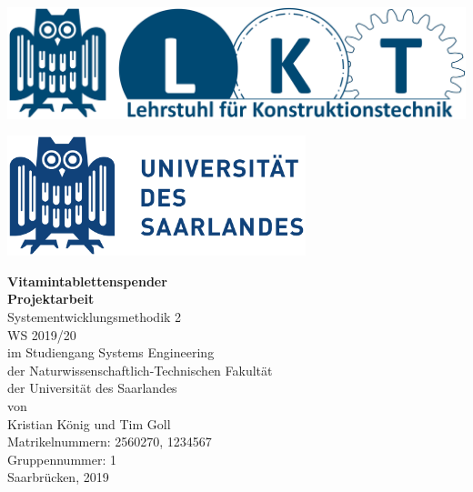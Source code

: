 \documentclass[a4paper,12pt, headings=small, bibtotoc, numbers=noenddot]{scrreprt} %
\begin{document}
\pagestyle{empty}   %


\label{Coversheet}
\begin{minipage}{0.5\textwidth}
\begin{flushleft}
\includegraphics[width=\textwidth]{Bilder/LKT_logo.png}
\end{flushleft}
\end{minipage}
\begin{minipage}{0.5\textwidth}
\begin{flushright}
\includegraphics[width=0.65\textwidth]{Bilder/UdS_Logo.png}
\end{flushright}
\end{minipage}
\headrule

\vspace{1.5cm}

\begin{center}
\LARGE \textbf{Vitamintablettenspender}\\ 
\vspace{3cm}
\textbf{Projektarbeit} \\
\Large Systementwicklungsmethodik 2\\ 
WS 2019/20\\
im Studiengang Systems Engineering\\
der Naturwissenschaftlich-Technischen Fakultät \\
der Universität des Saarlandes\\
\vspace{2.5cm}
\Large von\\
\vspace{1cm}
Kristian König und Tim Goll\\
Matrikelnummern: 2560270, 1234567 \\
Gruppennummer: 1\\
\vspace{1cm}
Saarbrücken, 2019
\end{center}
\newpage 
\end{document}
